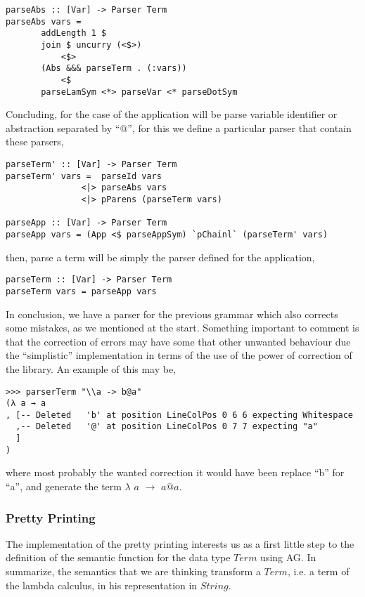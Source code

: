 \documentclass[a4paper,10pt]{article}
\begin{document}
\begin{lstlisting}
parseAbs :: [Var] -> Parser Term
parseAbs vars = 
       addLength 1 $
       join $ uncurry (<$>) 
           <$> 
       (Abs &&& parseTerm . (:vars))
       	   <$ 
       parseLamSym <*> parseVar <* parseDotSym
\end{lstlisting}

Concluding, for the case of the application will be parse variable identifier or
abstraction separated by ``$@$'', for this we define a particular parser that
contain these parsers,

\begin{lstlisting}
parseTerm' :: [Var] -> Parser Term
parseTerm' vars =  parseId vars
               <|> parseAbs vars
               <|> pParens (parseTerm vars)

parseApp :: [Var] -> Parser Term
parseApp vars = (App <$ parseAppSym) `pChainl` (parseTerm' vars)
\end{lstlisting}

then, parse a term will be simply the parser defined for the application,

\begin{lstlisting}
parseTerm :: [Var] -> Parser Term
parseTerm vars = parseApp vars
\end{lstlisting}

In conclusion, we have a parser for the previous grammar which also corrects some
mistakes, as we mentioned at the start. Something important to comment is that the
correction of errors may have some that other unwanted behaviour due the ``simplistic''
implementation in terms of the use of the power of correction of the library. An
example of this may be,

\begin{verbatim}
>>> parserTerm "\\a -> b@a"
(λ a → a
, [-- Deleted   'b' at position LineColPos 0 6 6 expecting Whitespace
  ,-- Deleted   '@' at position LineColPos 0 7 7 expecting "a"
  ]
)
\end{verbatim}

where most probably the wanted correction it would have been replace ``b'' for
``a'', and generate the term $\lambda$ $a$ $\rightarrow$ $a@a$.

\subsubsection{Pretty Printing}

The implementation of the pretty printing interests us as a first little step to
the definition of the semantic function for the data type $Term$ using AG. In
summarize, the semantics that we are thinking transform a $Term$, i.e. a term
of the lambda calculus, in his representation in $String$.\\
\end{document}
